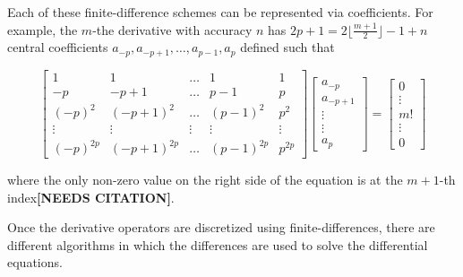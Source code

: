 \documentclass{report}
\begin{document}
                Each of these finite-difference schemes can be represented via coefficients.  For example, the $m$-the derivative with accuracy $n$ has $2p + 1 = 2 \lfloor \frac{m + 1}{2} \rfloor - 1 + n$ central coefficients $a_{-p}, a_{-p + 1}, \ldots, a_{p - 1}, a_p$ defined such that

                \begin{equation}
                    \begin{bmatrix}
                        1         & 1             & \ldots & 1            & 1 \\
                        -p        & -p + 1        & \ldots & p - 1        & p \\
                        (-p)^2    & (-p + 1)^2    & \ldots & (p - 1)^2    & p^2 \\
                        \vdots    & \vdots        & \vdots & \vdots       & \vdots \\
                        (-p)^{2p} & (-p + 1)^{2p} & \ldots & (p - 1)^{2p} & p^{2p} 
                    \end{bmatrix}
                    \begin{bmatrix}
                        a_{-p} \\
                        a_{-p + 1} \\
                        \vdots \\
                        \vdots \\
                        a_p
                    \end{bmatrix} = 
                    \begin{bmatrix}
                        0 \\
                        \vdots \\
                        m! \\
                        \vdots \\
                        0
                    \end{bmatrix}
                \end{equation}

                where the only non-zero value on the right side of the equation is at the $m+1$-th index\textbf{[NEEDS CITATION]}.
                
                Once the derivative operators are discretized using finite-differences, there are different algorithms in which the differences are used to solve the differential equations.
\end{document}
